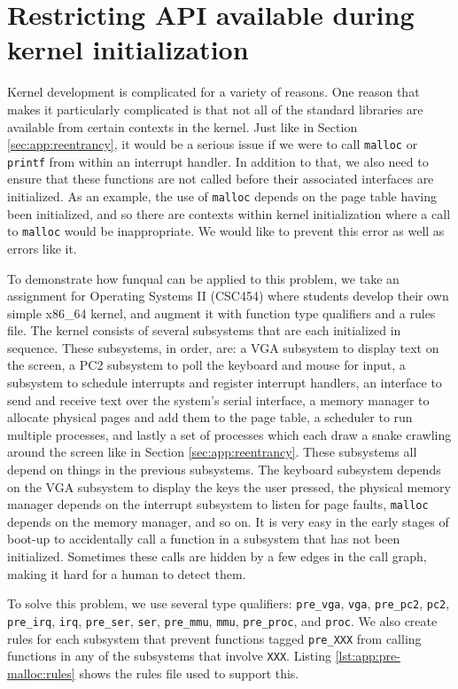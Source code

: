 \section{Restricting API available during kernel initialization}\label{sec:app:pre-malloc}

Kernel development is complicated for a variety of reasons.  One reason that makes it particularly complicated is that not all of the standard libraries are available from certain contexts in the kernel.  Just like in Section \ref{sec:app:reentrancy}, it would be a serious issue if we were to call \lstinline{malloc} or \lstinline{printf} from within an interrupt handler.  In addition to that, we also need to ensure that these functions are not called before their associated interfaces are initialized.  As an example, the use of \lstinline{malloc} depends on the page table having been initialized, and so there are contexts within kernel initialization where a call to \lstinline{malloc} would be inappropriate.  We would like to prevent this error as well as errors like it. 

To demonstrate how funqual can be applied to this problem, we take an assignment for Operating Systems II (CSC454) where students develop their own simple x86\_64 kernel, and augment it with function type qualifiers and a rules file.  The kernel consists of several subsystems that are each initialized in sequence.  These subsystems, in order, are: a VGA subsystem to display text on the screen, a PC2 subsystem to poll the keyboard and mouse for input, a subsystem to schedule interrupts and register interrupt handlers, an interface to send and receive text over the system's serial interface, a memory manager to allocate physical pages and add them to the page table, a scheduler to run multiple processes, and lastly a set of processes which each draw a snake crawling around the screen like in Section \ref{sec:app:reentrancy}.  These subsystems all depend on things in the previous subsystems.  The keyboard subsystem depends on the VGA subsystem to display the keys the user pressed, the physical memory manager depends on the interrupt subsystem to listen for page faults, \lstinline{malloc} depends on the memory manager, and so on.  It is very easy in the early stages of boot-up to accidentally call a function in a subsystem that has not been initialized.  Sometimes these calls are hidden by a few edges in the call graph, making it hard for a human to detect them.  

To solve this problem, we use several type qualifiers:  \lstinline{pre_vga}, \lstinline{vga}, \lstinline{pre_pc2}, \lstinline{pc2}, \lstinline{pre_irq}, \lstinline{irq}, \lstinline{pre_ser}, \lstinline{ser}, \lstinline{pre_mmu}, \lstinline{mmu}, \lstinline{pre_proc}, and \lstinline{proc}.  We also create rules for each subsystem that prevent functions tagged \lstinline{pre_XXX} from calling functions in any of the subsystems that involve \lstinline{XXX}.  Listing \ref{lst:app:pre-malloc:rules} shows the rules file used to support this.  

